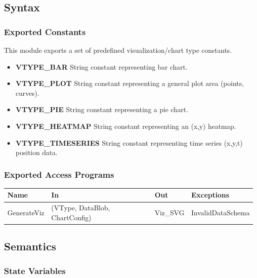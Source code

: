 \documentclass[12pt, titlepage]{article}
\begin{document}
\subsection{Syntax}

\subsubsection{Exported Constants}

This module exports a set of predefined visualization/chart type constants.

\begin{itemize}
  \item \textbf{VTYPE\_BAR} String constant representing bar chart. 
  \item \textbf{VTYPE\_PLOT} String constant representing a general plot area (points, curves). 
  \item \textbf{VTYPE\_PIE} String constant representing a pie chart. 
  \item \textbf{VTYPE\_HEATMAP} String constant representing an (x,y) heatmap. 
  \item \textbf{VTYPE\_TIMESERIES} String constant representing time series (x,y,t) position data. 

\end{itemize}




\subsubsection{Exported Access Programs}

\begin{center}
\begin{tabular}{p{2cm} p{4cm} p{2cm} p{4cm}}
\hline
\textbf{Name} & \textbf{In} & \textbf{Out} & \textbf{Exceptions} \\
\hline
GenerateViz & (VType, DataBlob, ChartConfig)  & Viz\_SVG & InvalidDataSchema \\
\hline
\end{tabular}
\end{center}

\subsection{Semantics}

\subsubsection{State Variables}
\end{document}
